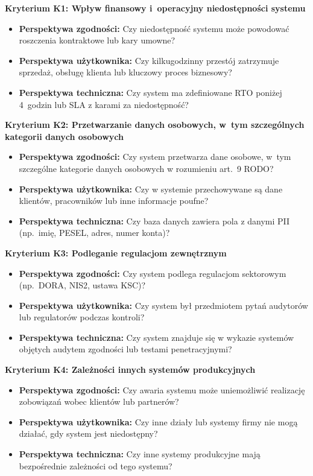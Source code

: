 \bigskip
\noindent\textbf{Kryterium K1: Wpływ finansowy i~operacyjny
niedostępności systemu}
\begin{itemize}
\item \textbf{Perspektywa zgodności:} Czy niedostępność
systemu może powodować roszczenia kontraktowe lub
kary umowne?
\item \textbf{Perspektywa użytkownika:} Czy kilkugodzinny
przestój zatrzymuje sprzedaż, obsługę klienta lub
kluczowy proces biznesowy?
\item \textbf{Perspektywa techniczna:} Czy system ma
zdefiniowane RTO poniżej 4~godzin lub SLA z karami
za niedostępność?
\end{itemize}

\noindent\textbf{Kryterium K2: Przetwarzanie danych osobowych,
w~tym szczególnych kategorii danych osobowych}
\begin{itemize}
\item \textbf{Perspektywa zgodności:} Czy system przetwarza
dane osobowe, w~tym szczególne kategorie danych osobowych
w rozumieniu art.~9 RODO?
\item \textbf{Perspektywa użytkownika:} Czy w systemie
przechowywane są dane klientów, pracowników lub inne
informacje poufne?
\item \textbf{Perspektywa techniczna:} Czy baza danych
zawiera pola z danymi PII
(np.\ imię, PESEL, adres, numer konta)?
\end{itemize}

\noindent\textbf{Kryterium K3: Podleganie regulacjom zewnętrznym}
\begin{itemize}
\item \textbf{Perspektywa zgodności:} Czy system podlega
regulacjom sektorowym
(np.\ DORA, NIS2, ustawa KSC)?
\item \textbf{Perspektywa użytkownika:} Czy system był
przedmiotem pytań audytorów lub regulatorów
podczas kontroli?
\item \textbf{Perspektywa techniczna:} Czy system znajduje
się w wykazie systemów objętych audytem zgodności
lub testami penetracyjnymi?
\end{itemize}

\noindent\textbf{Kryterium K4: Zależności innych systemów
produkcyjnych}
\begin{itemize}
\item \textbf{Perspektywa zgodności:} Czy awaria systemu
może uniemożliwić realizację zobowiązań wobec klientów
lub partnerów?
\item \textbf{Perspektywa użytkownika:} Czy inne działy
lub systemy firmy nie mogą działać, gdy system jest
niedostępny?
\item \textbf{Perspektywa techniczna:} Czy inne systemy
produkcyjne mają bezpośrednie zależności od tego systemu?
\end{itemize}

